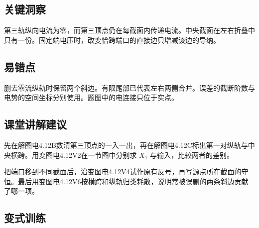 \documentclass[UTF8,fontset=fandol,a4paper,11pt]{ctexart}
\begin{document}

\subsection*{关键洞察}

第三轨纵向电流为零，而第三顶点仍在每截面内传递电流。中央截面在左右折叠中只有一份。固定端电压时，改变恰跨端口的直接边只增减该边的导纳。



\subsection*{易错点}

删去零流纵轨时保留两个斜边。有限尾部已代表左右两侧合并。误差的截断阶数与电势的空间坐标分别使用。题图中的电连接只位于实点。



\subsection*{课堂讲解建议}

先在解图电4.12B数清第三顶点的一入一出，再在解图电4.12C标出第一对纵轨与中央横跨。用变图电4.12V2在一节图中分别求 $X_1$ 与输入，比较两者的差别。

把端口移到不同截面后，沿变图电4.12V4试作原有反号，再写源点所在截面的守恒。最后用变图电4.12V6按横跨和纵轨归类耗散，说明常被误删的两条斜边贡献了哪一项。


\subsection*{变式训练}
\end{document}
